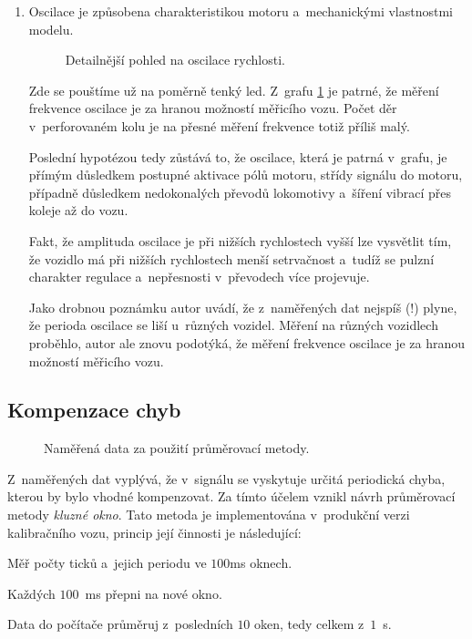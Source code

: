 \begin{enumerate}
\item Oscilace je způsobena charakteristikou motoru a~mechanickými vlastnostmi
modelu.

\begin{figure}[h]

\caption{Detailnější pohled na oscilace rychlosti.}
\label{fig:speed-presny}
\end{figure}

Zde se pouštíme už na poměrně tenký led. Z~grafu \ref{fig:speed-presny} je
patrné, že měření frekvence oscilace je za hranou možností měřicího
vozu. Počet děr v~perforovaném kolu je na přesné měření frekvence totiž příliš
malý.

Poslední hypotézou tedy zůstává to, že oscilace, která je patrná v~grafu,
je přímým důsledkem postupné aktivace pólů motoru, střídy signálu do motoru,
případně důsledkem nedokonalých převodů lokomotivy a~šíření vibrací přes
koleje až do vozu.

Fakt, že amplituda oscilace je při nižších rychlostech vyšší lze vysvětlit tím,
že vozidlo má při nižších rychlostech menší setrvačnost a~tudíž se pulzní
charakter regulace a~nepřesnosti v~převodech více projevuje.

Jako drobnou poznámku autor uvádí, že z~naměřených dat nejspíš (!) plyne,
že perioda oscilace se liší u~různých vozidel. Měření na různých vozidlech
proběhlo, autor ale znovu podotýká, že měření frekvence oscilace je za hranou
možností měřicího vozu.

\end{enumerate}

\subsection{Kompenzace chyb}
\label{subsec:wsm-kompenzace}

\begin{figure}[h]

\caption{Naměřená data za použití průměrovací metody.}
\label{fig:prumer}
\end{figure}

Z~naměřených dat vyplývá, že v~signálu se vyskytuje určitá periodická chyba,
kterou by bylo vhodné kompenzovat. Za tímto účelem vznikl návrh průměrovací
metody \textit{kluzné okno}. Tato metoda je implementována v~produkční verzi
kalibračního vozu, princip její činnosti je následující:

\begin{compactenum}
\item Měř počty ticků a~jejich periodu ve $100$ms oknech.
\item Každých $100$~ms přepni na nové okno.
\item Data do počítače průměruj z~posledních $10$ oken, tedy celkem z~$1$~s.
\end{compactenum}

